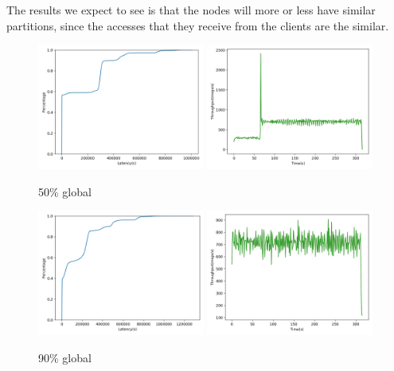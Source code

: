 The results we expect to see is that the nodes will more or less have similar partitions, since the accesses that they receive from the clients are the similar.

\begin{figure}[!htb]
  \centering
  \includegraphics[width=0.49\textwidth,height=\textheight,keepaspectratio]{img/global50_lat.png}
  \includegraphics[width=0.49\textwidth,height=\textheight,keepaspectratio]{img/global50_tp.png}
  \caption[caption]{ 50\% global }
  \label{fig:global50-performance}
\end{figure}

\begin{figure}[!htb]
  \centering
  \includegraphics[width=0.49\textwidth,height=\textheight,keepaspectratio]{img/global10_lat.png}
  \includegraphics[width=0.49\textwidth,height=\textheight,keepaspectratio]{img/global10_tp.png}
  \caption[caption]{ 90\% global }
  \label{fig:global10-performance}
\end{figure}

